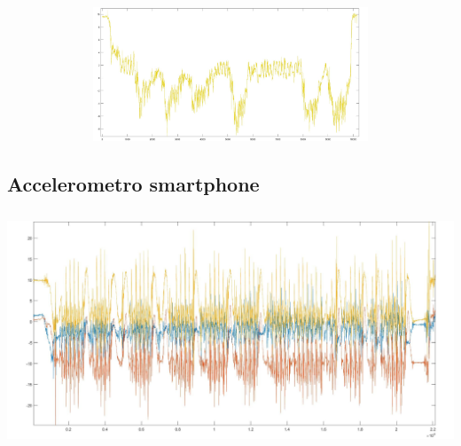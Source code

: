 \documentclass[a4paper, oneside]{book}
\begin{document}
\begin{minipage}{\linewidth}
\begin{center}
\includegraphics[width=154mm, height= 40mm]{./images/registrazione_tesi/accZ.jpg} 
\end{center}
\end{minipage}
\makebox[\linewidth]{}
\makebox[\linewidth]{}\makebox[\linewidth]{}\makebox[\linewidth]{}
\makebox[\linewidth]{}\makebox[\linewidth]{}\makebox[\linewidth]{}

\subsection{Accelerometro smartphone}
\begin{minipage}{\linewidth}
\begin{center}
\includegraphics[width=160mm, height= 70mm]{./images/registrazione_tesi/acc_ph.jpg} 
\end{center}
\end{minipage}
\makebox[\linewidth]{}
\makebox[\linewidth]{}\makebox[\linewidth]{}\makebox[\linewidth]{}
\makebox[\linewidth]{}\makebox[\linewidth]{}\makebox[\linewidth]{}
\makebox[\linewidth]{}\makebox[\linewidth]{}\makebox[\linewidth]{}
\end{document}
